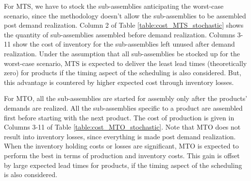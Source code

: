 \documentclass[twoside,onecolumn,12pt,letterpaper]{article}
\begin{document}
For MTS, we have to stock the sub-assemblies anticipating the worst-case scenario, since the methodology doesn't allow the sub-assemblies to be assembled post demand realization. Column 2 of Table \ref{table:cost_MTS_stochastic} shows the quantity of sub-assemblies assembled before demand realization. Columns 3-11 show the cost of inventory for the sub-assemblies left unused after demand realization. Under the assumption that all sub-assemblies be stocked up for the worst-case scenario, MTS is expected to deliver the least lead times (theoretically zero) for products if the timing aspect of the scheduling is also considered. But, this advantage is countered by higher expected cost through inventory losses.

For MTO, all the sub-assemblies are started for assembly only after the products' demands are realized. All  the sub-assemblies specific to a product are assembled first before starting with the next product. The cost of production is given in Columns 3-11 of Table \ref{table:cost_MTO_stochastic}. Note that MTO does not result into inventory losses, since everything is made post demand realization. When the inventory holding costs or losses are significant, MTO is expected to perform the best in terms of production and inventory costs. This gain is offset by large expected lead times for products, if the timing aspect of the scheduling is also considered.
\end{document}
